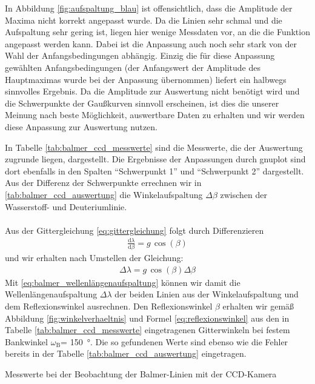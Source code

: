\documentclass[11pt, a4paper]{article}
\numberwithin{equation}{section}
\begin{document}
In Abbildung \ref{fig:aufspaltung_blau} ist offensichtlich, dass die Amplitude der Maxima nicht korrekt angepasst wurde.
Da die Linien sehr schmal und die Aufspaltung sehr gering ist, liegen hier wenige Messdaten vor, an die die Funktion angepasst werden kann.
Dabei ist die Anpassung auch noch sehr stark von der Wahl der Anfangsbedingungen abhängig.
Einzig die für diese Anpassung gewählten Anfangsbedingungen (der Anfangswert der Amplitude des Hauptmaximas wurde bei der Anpassung übernommen) liefert ein halbwegs sinnvolles Ergebnis.
Da die Amplitude zur Auswertung nicht benötigt wird und die Schwerpunkte der Gaußkurven sinnvoll erscheinen, ist dies die unserer Meinung nach beste Möglichkeit, auswertbare Daten zu erhalten und wir werden diese Anpassung zur Auswertung nutzen.

In Tabelle \ref{tab:balmer_ccd_messwerte} sind die Messwerte, die der Auswertung zugrunde liegen, dargestellt.
Die Ergebnisse der Anpassungen durch gnuplot sind dort ebenfalls  in den Spalten "`Schwerpunkt 1"' und "`Schwerpunkt 2"' dargestellt.
Aus der Differenz der Schwerpunkte errechnen wir in \ref{tab:balmer_ccd_auswertung} die Winkelaufspaltung $\Delta\beta$ zwischen der Wasserstoff- und Deuteriumlinie.\\
\\
Aus der Gittergleichung \eqref{eq:gittergleichung} folgt durch Differenzieren
\begin{align*}
\frac{\text{d}\lambda}{\text{d}\beta}=g\,\cos(\beta)
\end{align*}
und wir erhalten nach Umstellen der Gleichung:
\begin{align}
\Delta\lambda=g\,\cos(\beta)\Delta\beta
\label{eq:balmer_wellenlängenaufspaltung}
\end{align}
Mit \eqref{eq:balmer_wellenlängenaufspaltung} können wir damit die Wellenlängenaufspaltung $\Delta\lambda$ der beiden Linien aus der Winkelaufspaltung und dem Reflexionswinkel ausrechnen.
Den Reflexionswinkel $\beta$ erhalten wir gemäß Abbildung \ref{fig:winkelverhaeltnis} und Formel  \eqref{eq:reflexionswinkel} aus den in Tabelle \ref{tab:balmer_ccd_messwerte} eingetragenen Gitterwinkeln bei festem Bankwinkel $\omega_\text{B}$= \SI{150}{\degree}.
Die so gefundenen Werte sind ebenso wie die Fehler bereits in der Tabelle \ref{tab:balmer_ccd_auswertung} eingetragen.
\begin{table}[h]
\centering
\resizebox{\columnwidth}{!}{%
}
\caption{Messwerte bei der Beobachtung der Balmer-Linien mit der CCD-Kamera}
\label{tab:balmer_ccd_messwerte}
\end{table}
\end{document}
